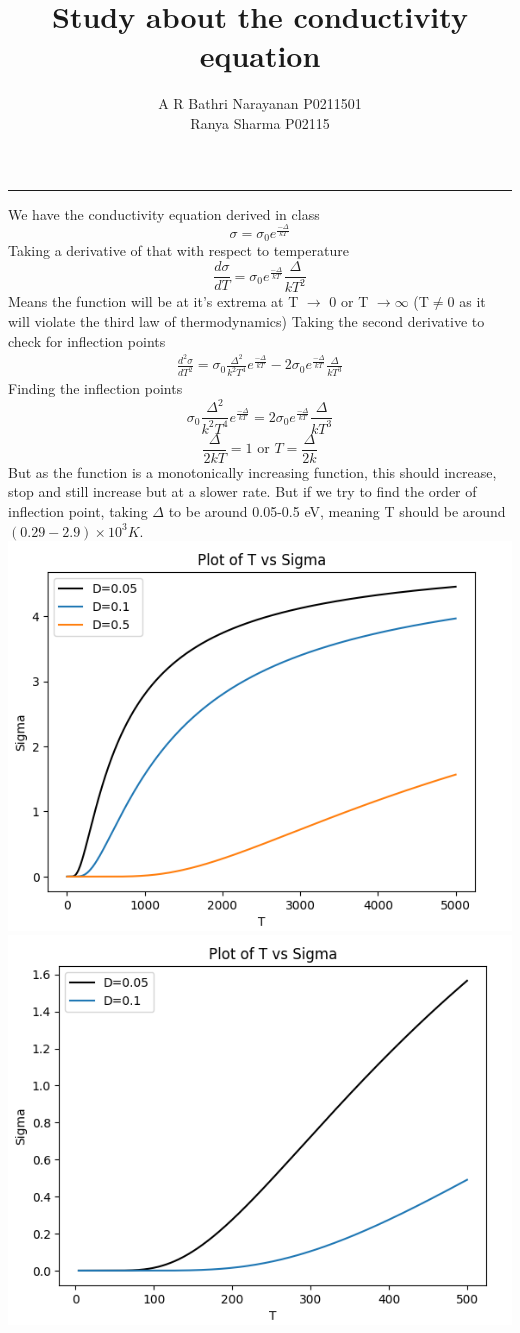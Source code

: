 \documentclass[12pt,a4paper]{article}
\title{Study about the conductivity equation}
\author{A R Bathri Narayanan P0211501\\Ranya Sharma P02115}
\date{}
\begin{document}
	\maketitle
	\par\noindent\rule{\textwidth}{0.4pt}
	We have the conductivity equation derived in class
	\[\sigma = \sigma_0 e^{\frac{-\Delta}{kT}}\]
	Taking a derivative of that with respect to temperature
	\[\frac{d\sigma}{dT}=\sigma_0e^{\frac{-\Delta}{kT}}\frac{\Delta}{kT^2}\]
	Means the function will be at it's extrema at T $\rightarrow$ 0 or T $\rightarrow \infty$ (T$\neq$0 as it will violate the third law of thermodynamics)
	Taking the second derivative to check for inflection points
	\begin{align*}
		\frac{d^2\sigma}{dT^2}=\sigma_0\frac{\Delta^2}{k^2T^4}e^{\frac{-\Delta}{kT}}-2\sigma_0e^{\frac{-\Delta}{kT}}\frac{\Delta}{kT^3}
	\end{align*}
	Finding the inflection points
	\[\sigma_0\frac{\Delta^2}{k^2T^4}e^{\frac{-\Delta}{kT}}=2\sigma_0e^{\frac{-\Delta}{kT}}\frac{\Delta}{kT^3}\]
	\[\frac{\Delta}{2kT}=1 \text{ or } T = \frac{\Delta}{2k}\]
	 But as the function is a monotonically increasing function, this should increase, stop and still increase but at a slower rate.
	 But if we try to find the order of inflection point, taking $\Delta$ to be around 0.05-0.5 eV, meaning T should be around $(0.29-2.9) \times 10^{3} K.$\\
	 \includegraphics[width=10 cm]{sigma1.png}
	  \includegraphics[width=10 cm]{sigma2.png}
\end{document}
